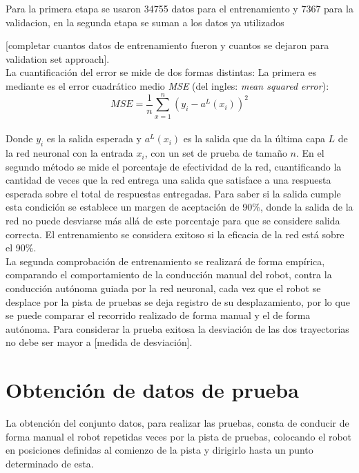 \documentclass{iccmemoria}
\begin{document}
Para la primera etapa se usaron 34755 datos para el entrenamiento y 7367 para la validacion, en la segunda etapa se suman a los datos ya utilizados 
 
[completar cuantos datos de entrenamiento fueron y cuantos se dejaron para validation set approach].\\
 
La cuantificación del error se mide de dos formas distintas: La primera es mediante es el error cuadrático medio \emph{MSE} (del ingles: \emph{mean squared error}):\\

\begin{equation}
	MSE = \frac{1}{n} \sum^n_{x=1} (y_i-a^L(x_i))^2
\end{equation}\\

Donde $y_i$ es la salida esperada y $a^L(x_i)$ es la salida que da la última capa $L$ de la red neuronal con la entrada $x_i$, con un set de prueba de tamaño $n$. En el segundo método se mide el porcentaje de efectividad de la red, cuantificando la cantidad de veces que la red entrega una salida que satisface a una respuesta esperada sobre el total de respuestas entregadas. Para saber si la salida cumple esta condición se establece un margen de aceptación de 90$\%$, donde la salida de la red no puede desviarse más allá de este porcentaje para que se considere salida correcta. El entrenamiento se considera exitoso si la eficacia de la red está sobre el 90$\%$.\\
 
La segunda comprobación de entrenamiento se realizará de forma empírica, comparando el comportamiento de la conducción manual del robot, contra la conducción autónoma guiada por la red neuronal, cada vez que el robot se desplace por la pista de pruebas se deja registro de su desplazamiento, por lo que se puede comparar el recorrido realizado de forma manual y el de forma autónoma. Para considerar la prueba exitosa la desviación de las dos trayectorias no debe ser mayor a [medida de desviación].\\
 
\section{Obtención de datos de prueba}
 
La obtención del conjunto datos, para realizar las pruebas, consta de conducir de forma manual el robot repetidas veces por la pista de pruebas, colocando el robot en posiciones definidas al comienzo de la pista y dirigirlo hasta un punto determinado de esta.\\
 
\end{document}
